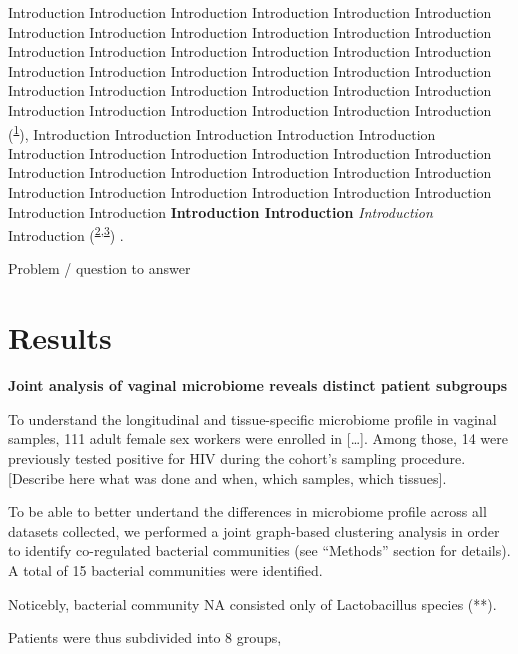 \documentclass[
]{article}
\begin{document}
Introduction Introduction Introduction Introduction Introduction Introduction Introduction Introduction Introduction Introduction Introduction Introduction Introduction Introduction Introduction Introduction Introduction Introduction Introduction Introduction Introduction Introduction Introduction Introduction Introduction Introduction Introduction Introduction Introduction Introduction Introduction Introduction Introduction Introduction Introduction Introduction (\textsuperscript{\protect\hyperlink{ref-Johnston1972}{1}}), Introduction Introduction Introduction Introduction Introduction Introduction Introduction Introduction Introduction Introduction Introduction Introduction Introduction Introduction Introduction Introduction Introduction Introduction Introduction Introduction Introduction Introduction Introduction Introduction Introduction \textbf{Introduction Introduction} \emph{Introduction} Introduction (\textsuperscript{\protect\hyperlink{ref-Darwin1859}{2}}\textsuperscript{,}\textsuperscript{\protect\hyperlink{ref-Bumpus1898}{3}}) .

Problem / question to answer

\clearpage

\hypertarget{results}{%
\section{Results}\label{results}}

\textbf{Joint analysis of vaginal microbiome reveals distinct patient subgroups}

To understand the longitudinal and tissue-specific microbiome profile in vaginal samples, 111 adult female sex workers were enrolled in {[}\ldots{]}. Among those, 14 were previously tested positive for HIV during the cohort's sampling procedure. {[}Describe here what was done and when, which samples, which tissues{]}.

To be able to better undertand the differences in microbiome profile across all datasets collected, we performed a joint graph-based clustering analysis in order to identify co-regulated bacterial communities (see ``Methods'' section for details). A total of 15 bacterial communities were identified.

Noticebly, bacterial community NA consisted only of Lactobacillus species (**).

Patients were thus subdivided into 8 groups,
\end{document}
